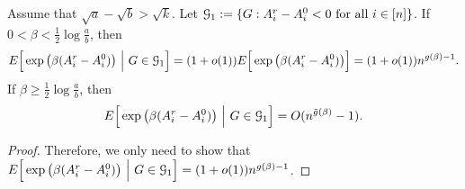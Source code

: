 \documentclass{article}
\begin{document}
\begin{proposition}  \label{prop:df}
Assume that $\sqrt{a}-\sqrt{b}>\sqrt{k}$. Let $\mathcal{G}_1:=\{G:A^r_i-A^0_i<0\text{~for all~}i\in[n]\}$.
If $0<\beta<\frac{1}{2}\log\frac{a}{b}$, then
$$
E \Big[  \exp\big(\beta (A^r_i-A^0_i) \big) ~\Big|~ G\in\mathcal{G}_1 \Big] 
= (1+o(1)) E \Big[   \exp\big(\beta (A^r_i-A^0_i) \big) \Big]
= (1+o(1)) n^{g(\beta)-1}  .
$$
If $\beta\ge\frac{1}{2}\log\frac{a}{b}$, then
\begin{align*}
E \Big[  \exp\big(\beta (A^r_i-A^0_i) \big) ~\Big|~ G\in\mathcal{G}_1 \Big] 
= O(n^{\tilde{g}(\beta)}-1)  .
\end{align*}
\end{proposition}
\begin{proof}

Therefore, we only need to show that
$E \Big[\exp\big(\beta (A^r_i-A^0_i) \big) ~\Big|~ G\in\mathcal{G}_1 \Big] = (1+o(1))n^{g(\beta) - 1}$.


\end{proof}
\end{document}
